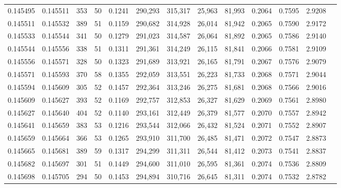 \begin{tabular}{rrrrrrrrrrrrr}
0.145495 & 0.145511 &   353 &  50 &                                     0.1241 & 290,293 & 315,317 &  25,963 &  81,993 & 0.2064 & 0.7595 & 2.9208 \\
0.145511 & 0.145532 &   389 &  51 &                                     0.1159 & 290,682 & 314,928 &  26,014 &  81,942 & 0.2065 & 0.7590 & 2.9172 \\
0.145533 & 0.145544 &   341 &  50 &                                     0.1279 & 291,023 & 314,587 &  26,064 &  81,892 & 0.2065 & 0.7586 & 2.9140 \\
0.145544 & 0.145556 &   338 &  51 &                                     0.1311 & 291,361 & 314,249 &  26,115 &  81,841 & 0.2066 & 0.7581 & 2.9109 \\
0.145556 & 0.145571 &   328 &  50 &                                     0.1323 & 291,689 & 313,921 &  26,165 &  81,791 & 0.2067 & 0.7576 & 2.9079 \\
0.145571 & 0.145593 &   370 &  58 &                                     0.1355 & 292,059 & 313,551 &  26,223 &  81,733 & 0.2068 & 0.7571 & 2.9044 \\
0.145594 & 0.145609 &   305 &  52 &                                     0.1457 & 292,364 & 313,246 &  26,275 &  81,681 & 0.2068 & 0.7566 & 2.9016 \\
0.145609 & 0.145627 &   393 &  52 &                                     0.1169 & 292,757 & 312,853 &  26,327 &  81,629 & 0.2069 & 0.7561 & 2.8980 \\
0.145627 & 0.145640 &   404 &  52 &                                     0.1140 & 293,161 & 312,449 &  26,379 &  81,577 & 0.2070 & 0.7557 & 2.8942 \\
0.145641 & 0.145659 &   383 &  53 &                                     0.1216 & 293,544 & 312,066 &  26,432 &  81,524 & 0.2071 & 0.7552 & 2.8907 \\
0.145659 & 0.145664 &   366 &  53 &                                     0.1265 & 293,910 & 311,700 &  26,485 &  81,471 & 0.2072 & 0.7547 & 2.8873 \\
0.145665 & 0.145681 &   389 &  59 &                                     0.1317 & 294,299 & 311,311 &  26,544 &  81,412 & 0.2073 & 0.7541 & 2.8837 \\
0.145682 & 0.145697 &   301 &  51 &                                     0.1449 & 294,600 & 311,010 &  26,595 &  81,361 & 0.2074 & 0.7536 & 2.8809 \\
0.145698 & 0.145705 &   294 &  50 &                                     0.1453 & 294,894 & 310,716 &  26,645 &  81,311 & 0.2074 & 0.7532 & 2.8782 \\

\end{tabular}

